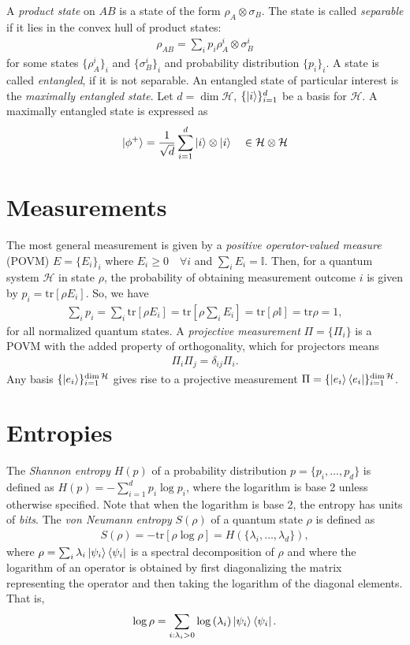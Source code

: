 \documentclass[10pt,oneside,longbibliography]{report}
\begin{document}
A \textit{product state} on $AB$ is a state of the form $\rho_A \otimes \sigma_B$. The state is called \textit{separable} if it lies in the convex hull of product states: 
\begin{align}
    \rho_{AB} = \sum_{i} p_i \rho_A^i \otimes \sigma_B^i
\end{align}
for some states $\{\rho_A^i\}_i$ and $\{\sigma_B^i\}_i$ and  probability distribution $\{p_i\}_i$. A state is called \textit{entangled}, if it is not separable. An entangled state of particular interest is the \textit{maximally entangled state}. Let $d=\dim\mathcal{H}$, $\{\ket{i}\}_{i=1}^d$ be a basis for $\mathcal{H}$. A maximally entangled state is expressed as
\begin{align}
    \ket{\phi^+} = \frac{1}{\sqrt{d}} \sum_{i=1}^d \ket{i}\otimes \ket{i} \quad \in \mathcal{H}\otimes \mathcal{H}
\end{align}
\section{Measurements}
The most general measurement is given by a \textit{positive operator-valued measure} (POVM) $E=\{E_i\}_i$ where $E_i \geq 0 \quad \forall i$ and $\sum_i E_i = \mathbb{I}$. Then, for a quantum system $\mathcal{H}$ in state $\rho$, the probability of obtaining measurement outcome $i$ is given by $p_i = \text{tr}[\rho E_i]$. So, we have 
\begin{align}
    \sum_i p_i = \sum_i \text{tr}[\rho E_i] = \text{tr}\left[\rho \sum_i E_ i\right] = \text{tr}[\rho \mathbb{I}] = \text{tr}\rho = 1,
\end{align}
for all normalized quantum states. A \textit{projective measurement} $\Pi =\{\Pi_i \}$ is a POVM with the added property of orthogonality, which for projectors means
\begin{align}
    \Pi_i \Pi_j =\delta_{ij} \Pi_i.
\end{align}
Any basis $\{\ket{e_i}\}^{\dim\mathcal{H}}_{i=1}$ gives rise to a projective measurement $\Pi=\{\ket{e_i}\bra{e_i}\}_{i=1}^{\dim\mathcal{H}}$.
\section{Entropies}
The \textit{Shannon entropy} $H(p)$ of a probability distribution $p=\{p_i, \dots, p_d\}$ is defined as $H(p)=-\sum_{i=1}^{d}p_i \log{p_i}$, where the logarithm is base 2 unless otherwise specified. Note that when the logarithm is base 2, the entropy has units of \textit{bits}. The \textit{von Neumann entropy} $S(\rho)$ of a quantum state $\rho$ is defined as 
\begin{align}
    S(\rho) = -\text{tr}\left[\rho \log \rho\right] = H(\{\lambda_i, \dots, \lambda_d\}),
\end{align}
where $\rho=\sum_i \lambda_i \ket{\psi_i}\bra{\psi_i}$ is a spectral decomposition of $\rho$ and where the logarithm of an operator is obtained by first diagonalizing the matrix representing the operator and then taking the logarithm of the diagonal elements. That is,
\begin{align}
    \log{\rho} = \sum_{i:\lambda_i >0} \log{(\lambda_i)} \ket{\psi_i}\bra{\psi_i}.
\end{align}
\end{document}

